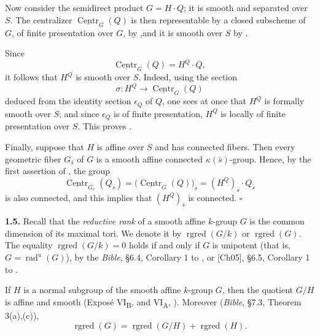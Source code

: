 Now consider the semidirect product \(G=H\cdot Q\); it is smooth and separated
over \(S\).  The centralizer \(\underline{\operatorname{Centr}}_{G}(Q)\) is
then representable by a closed subscheme of \(G\), of finite presentation over
\(G\), by ,\footnotemark[6] and it is smooth over \(S\) by
.

Since
\[
  \underline{\operatorname{Centr}}_{G}(Q)=H^{Q}\cdot Q,
\]
it follows that \(H^{Q}\) is smooth over \(S\).  Indeed, using the section
\[
  \sigma:H^{Q}\longrightarrow
  \underline{\operatorname{Centr}}_{G}(Q)
\]
deduced from the identity section \(\epsilon_{Q}\) of \(Q\), one sees at once
that \(H^{Q}\) is formally smooth over \(S\); and since \(\epsilon_{Q}\) is of
finite presentation, \(H^{Q}\) is locally of finite presentation over \(S\).
This proves .

Finally, suppose that \(H\) is affine over \(S\) and has connected fibers.
Then every geometric fiber \(G_{\bar{s}}\) of \(G\) is a smooth affine
connected \(\kappa(\bar{s})\)-group.  Hence, by the first assertion of ,
the group
\[
  \underline{\operatorname{Centr}}_{G_{\bar{s}}}(Q_{\bar{s}})
  =
  \bigl(\underline{\operatorname{Centr}}_{G}(Q)\bigr)_{\bar{s}}
  =
  (H^{Q})_{\bar{s}}\cdot Q_{\bar{s}}
\]
is also connected, and this implies that \((H^{Q})_{\bar{s}}\) is connected.
\hfill\(\square\)

\par\medskip\noindent{}\textbf{1.5.}\quad
Recall that the \emph{reductive rank} of a smooth affine \(k\)-group \(G\) is
the common dimension of its maximal tori.  We denote it by
\(\operatorname{rgred}(G/k)\) or \(\operatorname{rgred}(G)\).  The equality
\(\operatorname{rgred}(G/k)=0\) holds if and only if \(G\) is unipotent
(that is, \(G=\operatorname{rad}^{u}(G)\)), by the \emph{Bible}, §6.4,
Corollary 1 to , or [Ch05], §6.5, Corollary 1 to .

If \(H\) is a normal subgroup of the smooth affine \(k\)-group \(G\), then the
quotient \(G/H\) is affine and smooth (Exposé VI\textsubscript{B},  and
VI\textsubscript{A}, ).  Moreover (\emph{Bible}, §7.3,
Theorem 3(a),(c)),
\[
  \operatorname{rgred}(G)
  =
  \operatorname{rgred}(G/H)+\operatorname{rgred}(H).
\]

